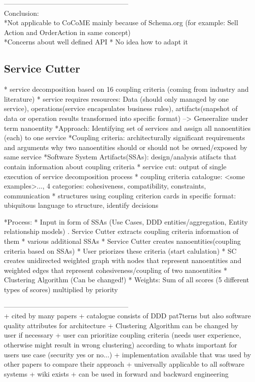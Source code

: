 ------------------------------------------------------\\

Conclusion:\\
*Not applicable to CoCoME mainly because of Schema.org (for example: Sell Action and OrderAction in same concept) \\
*Concerns about  well defined API
* No idea how to adapt it

\subsection{Service Cutter}

* service decomposition based on 16 coupling criteria (coming from industry and literature)
* service requires resources: Data (should only managed by one service), operations(service encapsulates business rules), artifacts(snapshot of data or operation results transformed into specific format) --> Geneeralize under term nanoentity
*Approach: Identifying set of services and assign all nanoentities (each) to one service
*Coupling criteria: architecturally significant requirements and arguments why two nanoentities should or should not be owned/exposed by same service
*Software System Artifacts(SSAs): design/analysis atifacts that contain information about coupling criteria
* service cut: output of single execution of service decomposition process
* coupling criteria catalogue:  <some examples>..., 4 categories: cohesiveness, compatibility, constraints, communication
* structures using coupling criterion cards in specific format: ubiquitous language to structure, identify decisions

*Process:
* Input in form of SSAs (Use Cases, DDD entities/aggregation, Entity relationship models) . Service Cutter extracts coupling criteria information of them
* various additional SSAs
* Service Cutter creates nanoentities(coupling criteria based on SSAs)
* User priorizes these criteria (start calulation)
* SC creates unidirected weighted graph with nodes that represent nanoentities and weighted edges that represent cohesiveness/coupling of two nanoentities
* Clustering Algorithm (Can be changed!)
* Weights: Sum of all scores (5 different types of scores) multiplied by priority

------------------------------------------------------\\



+ cited by many papers 
+ catalogue consists of DDD pat7terns but also software quality attributes for architecture
+ Clustering Algorithm can be changed by user if necessary
+ user can prioritize coupling criteria (needs user experience, otherwise might result in wrong clustering) according to whats important for users use case (security yes or no...)
+ implementation available that was used by other papers to compare their approach
+ universally applicable to all software systems
+ wiki exists
+ can be used in forward  and backward engineering

